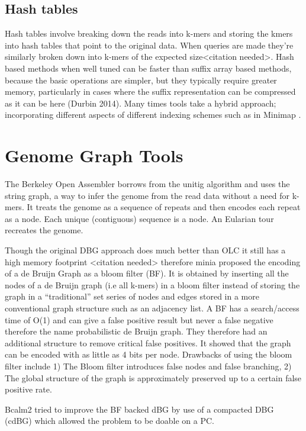\documentclass[11pt]{article}
\begin{document}
\subsection{Hash tables}
\label{sec:org863dd00}
Hash tables involve breaking down the reads into k-mers and storing the kmers
into hash tables that point to the original data. When queries are made they’re 
similarly broken down into k-mers of the expected size<citation needed>.
Hash based methods when well tuned can be faster than suffix array based 
methods, because the basic operations are simpler, but they typically require
greater memory, particularly in cases where the suffix representation can be
compressed as it can be here (Durbin 2014).
Many times tools take a hybrid approach; incorporating different aspects of
different indexing schemes such as in Minimap
\cite{liDesignConstructionReference2020}. 
\section{Genome Graph Tools}
\label{sec:org15a7c23}
The Berkeley Open Assembler \cite{myersFragmentAssemblyString2005} borrows 
from the unitig algorithm and uses the string graph, a way to infer the genome
from the read data without a need for k-mers.
It treats the genome as a sequence of repeats and then encodes each repeat as 
a node. Each unique (contiguous) sequence is a node. An Eularian tour recreates
the genome.

Though the original DBG approach does much better than OLC it still has a high 
memory footprint <citation needed> therefore minia
\cite{chikhiSpaceefficientExactBruijn2013} proposed the encoding of a 
de Bruijn Graph as a bloom filter (BF). It is obtained by inserting all the
nodes of a de Bruijn graph (i.e all k-mers) in a bloom filter instead of storing 
the graph in a “traditional” set series of nodes and edges stored in a more
conventional graph structure such as an adjacency list. 
A BF has a search/access time of O(1) and can give a false positive result but
never a false negative therefore the name probabilistic de Bruijn graph.  
They therefore had an additional structure to remove critical false positives.
It showed that the graph can be encoded with as little as 4 bits per node.
Drawbacks of using the bloom filter include 1) The Bloom filter introduces false
nodes and false branching, 2) The global structure of the graph is approximately
preserved up to a certain false positive rate.

Bcalm2 \cite{chikhiCompactingBruijnGraphs2016} tried to improve the BF backed dBG 
by use of a compacted DBG (cdBG) which allowed the problem to be doable on a PC.
\end{document}
